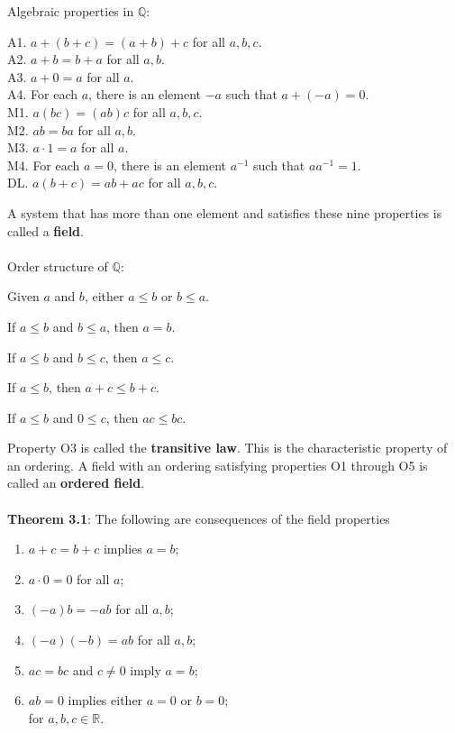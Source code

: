 \documentclass{article}
\theoremstyle{definition}
\begin{document}
Algebraic properties in $\mathbb{Q}$:
\begin{adjustwidth}{2.5em}{0pt} A1. $a + (b + c)=(a + b) + c$ for all $a, b, c$. \\
A2. $a + b = b + a$ for all $a, b$. \\
A3. $a + 0 = a$ for all $a$. \\
A4. For each $a$, there is an element $-a$ such that $a + (-a) = 0$. \\
M1. $a(bc)=(ab)c$ for all $a, b, c$. \\
M2. $ab = ba$ for all $a, b$. \\
M3. $a \cdot 1 = a$ for all $a$. \\
M4. For each $a = 0$, there is an element $a^{-1}$ such that $aa^{-1} = 1$. \\
DL. $a(b + c) = ab + ac$ for all $a, b, c$. \\
\end{adjustwidth}
A system that has more than one element and satisfies these nine properties is called a \textbf{field}. \\ \\
Order structure of $\mathbb{Q}$: \begin{OList}
    \item Given $a$ and $b$, either $a \leq b$ or $b \leq a$.
    \item If $a \leq b$ and $b \leq a$, then $a = b$.
    \item If $a \leq b$ and $b \leq c$, then $a \leq c$.
    \item If $a \leq b$, then $a + c \leq b + c$.
    \item If $a \leq b$ and $0 \leq c$, then $ac \leq bc$.
\end{OList}
\noindent Property O3 is called the \textbf{transitive law}. This is the characteristic property of an ordering. A field with an ordering satisfying properties O1 through O5 is called an \textbf{ordered field}. \\ \\
\textbf{Theorem 3.1}: The following are consequences of the field properties \begin{enumerate}
    \item $a + c = b + c$ implies $a = b$;
    \item $a \cdot 0 = 0$ for all $a$;
    \item $(-a)b = -ab$ for all $a, b$;
    \item $(-a)(-b) = ab$ for all $a, b$;
    \item $ac = bc$ and $c \neq 0$ imply $a = b$;
    \item $ab = 0$ implies either $a = 0$ or $b = 0$; \\
for $a, b, c \in \mathbb{R}$.
\end{enumerate}
\end{document}
